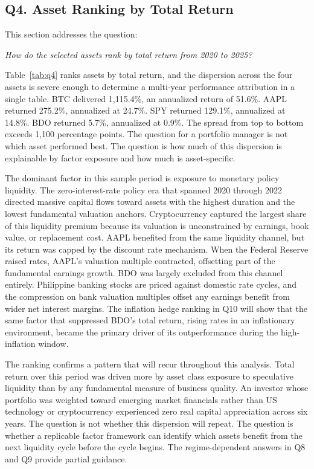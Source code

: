 \subsection{Q4. Asset Ranking by Total Return}

This section addresses the question:

\noindent\textit{How do the selected assets rank by total return from 2020 to 2025?}



Table~\ref{tab:q4} ranks assets by total return, and the dispersion across the four assets is severe enough to determine a multi-year performance attribution in a single table. BTC delivered 1,115.4\%, an annualized return of 51.6\%. AAPL returned 275.2\%, annualized at 24.7\%. SPY returned 129.1\%, annualized at 14.8\%. BDO returned 5.7\%, annualized at 0.9\%. The spread from top to bottom exceeds 1,100 percentage points. The question for a portfolio manager is not which asset performed best. The question is how much of this dispersion is explainable by factor exposure and how much is asset-specific.

The dominant factor in this sample period is exposure to monetary policy liquidity. The zero-interest-rate policy era that spanned 2020 through 2022 directed massive capital flows toward assets with the highest duration and the lowest fundamental valuation anchors. Cryptocurrency captured the largest share of this liquidity premium because its valuation is unconstrained by earnings, book value, or replacement cost. AAPL benefited from the same liquidity channel, but its return was capped by the discount rate mechanism. When the Federal Reserve raised rates, AAPL's valuation multiple contracted, offsetting part of the fundamental earnings growth. BDO was largely excluded from this channel entirely. Philippine banking stocks are priced against domestic rate cycles, and the compression on bank valuation multiples offset any earnings benefit from wider net interest margins. The inflation hedge ranking in Q10 will show that the same factor that suppressed BDO's total return, rising rates in an inflationary environment, became the primary driver of its outperformance during the high-inflation window.

The ranking confirms a pattern that will recur throughout this analysis. Total return over this period was driven more by asset class exposure to speculative liquidity than by any fundamental measure of business quality. An investor whose portfolio was weighted toward emerging market financials rather than US technology or cryptocurrency experienced zero real capital appreciation across six years. The question is not whether this dispersion will repeat. The question is whether a replicable factor framework can identify which assets benefit from the next liquidity cycle before the cycle begins. The regime-dependent answers in Q8 and Q9 provide partial guidance.

